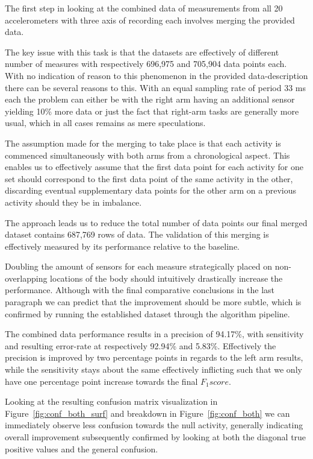 \documentclass{sig-alternate}
\begin{document}
The first step in looking at the combined data of measurements from all 20 accelerometers with three axis of recording each involves merging the provided data.

The key issue with this task is that the datasets are effectively of different number of measures with respectively 696,975 and 705,904 data points each. With no indication of reason to this phenomenon in the provided data-description there can be several reasons to this. With an equal sampling rate of period 33 ms each the problem can either be with the right arm having an additional sensor yielding 10\% more data or just the fact that right-arm tasks are generally more usual, which in all cases remains as mere speculations.

The assumption made for the merging to take place is that each activity is commenced simultaneously with both arms from a chronological aspect. This enables us to effectively assume that the first data point for each activity for one set should correspond to the first data point of the same activity in the other, discarding eventual supplementary data points for the other arm on a previous activity should they be in imbalance.

The approach leads us to reduce the total number of data points our final merged dataset contains 687,769 rows of data. The validation of this merging is effectively measured by its performance relative to the baseline.

Doubling the amount of sensors for each measure strategically placed on non-overlapping locations of the body should intuitively drastically increase the performance. Although with the final comparative conclusions in the last paragraph we can predict that the improvement should be more subtle, which is confirmed by running the established dataset through the algorithm pipeline.

The combined data performance results in a precision of 94.17\%, with sensitivity and resulting error-rate at respectively 92.94\% and 5.83\%. Effectively the precision is improved by two percentage points in regards to the left arm results, while the sensitivity stays about the same effectively inflicting such that we only have one percentage point increase towards the final $F_1 score$.

Looking at the resulting confusion matrix visualization in Figure~\ref{fig:conf_both_surf} and breakdown in Figure~\ref{fig:conf_both} we can immediately observe less confusion towards the null activity, generally indicating overall improvement subsequently confirmed by looking at both the diagonal true positive values and the general confusion.
\end{document}
